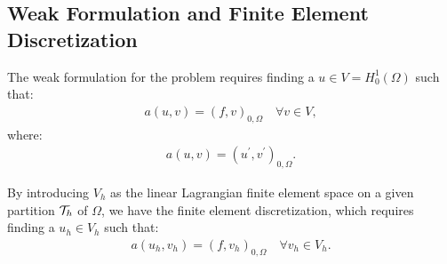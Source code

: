 \subsection{Weak Formulation and Finite Element Discretization} \label{fem_definition}

The weak formulation for the problem requires finding a \(u \in V = H_0^1(\Omega)\) such that:
\begin{gather}
	a(u, v) = (f, v)_{0, \Omega} \quad \forall v \in V,
\end{gather}
where:
\begin{gather}
	a(u, v) = (u^{\prime}, v^{\prime})_{0, \Omega}.
\end{gather}

By introducing \(V_h\) as the linear Lagrangian finite element space on a given partition \(\mathcal{T}_h\) of \(\Omega\), we have the finite element discretization, which requires finding a \(u_h \in V_h\) such that:
\begin{gather}
	a(u_h, v_h) = (f, v_h)_{0, \Omega} \quad \forall v_h \in V_h.
\end{gather}